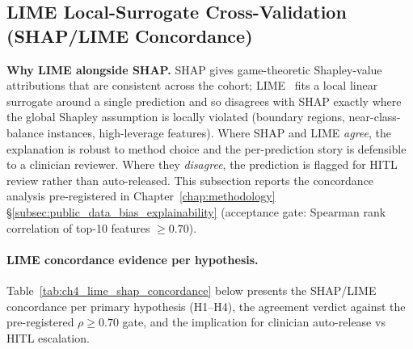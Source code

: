 
\subsection{LIME Local-Surrogate Cross-Validation (SHAP/LIME Concordance)}
\label{subsec:ch4_lime_analysis}

\textbf{Why LIME alongside SHAP.}
SHAP gives game-theoretic Shapley-value attributions that are consistent
across the cohort; LIME~\cite{ribeiro2016lime} fits a local linear
surrogate around a single prediction and so disagrees with SHAP exactly
where the global Shapley assumption is locally violated (boundary
regions, near-class-balance instances, high-leverage features). Where
SHAP and LIME \emph{agree}, the explanation is robust to method choice
and the per-prediction story is defensible to a clinician reviewer.
Where they \emph{disagree}, the prediction is flagged for HITL review
rather than auto-released. This subsection reports the concordance
analysis pre-registered in Chapter~\ref{chap:methodology}
§\ref{subsec:public_data_bias_explainability} (acceptance gate:
Spearman rank correlation of top-10 features $\geq 0.70$).

\paragraph{LIME concordance evidence per hypothesis.}

\noindent Table~\ref{tab:ch4_lime_shap_concordance} below presents the
SHAP/LIME concordance per primary hypothesis (H1--H4), the agreement
verdict against the pre-registered $\rho \geq 0.70$ gate, and the
implication for clinician auto-release vs HITL escalation.

